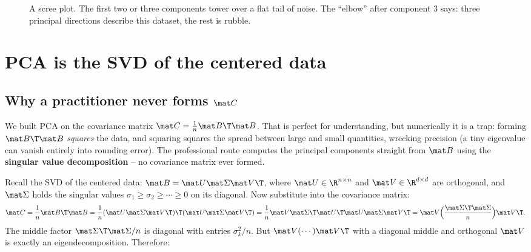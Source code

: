 \begin{figure}[H]
\centering
{}
\caption{A scree plot. The first two or three components tower over a flat tail of
noise. The ``elbow'' after component 3 says: three principal directions describe
this dataset, the rest is rubble.}
\label{ch30:scree}
\end{figure}

\section{PCA is the SVD of the centered data}

\subsection{Why a practitioner never forms $\mat C$}

We built PCA on the covariance matrix $\mat C=\tfrac1n\mat B\T\mat B$. That is
perfect for understanding, but numerically it is a trap: forming $\mat B\T\mat B$
\emph{squares} the data, and squaring squares the spread between large and small
quantities, wrecking precision (a tiny eigenvalue can vanish entirely into rounding
error). The professional route computes the principal components straight from
$\mat B$ using the \textbf{singular value decomposition} -- no covariance matrix
ever formed.

Recall the SVD of the centered data: $\mat B=\mat U\mat\Sigma\mat V\T$, where $\mat
U\in\R^{n\times n}$ and $\mat V\in\R^{d\times d}$ are orthogonal, and $\mat\Sigma$
holds the singular values $\sigma_1\ge\sigma_2\ge\cdots\ge0$ on its diagonal. Now
substitute into the covariance matrix:
\[
  \mat C=\frac1n\mat B\T\mat B
        =\frac1n(\mat U\mat\Sigma\mat V\T)\T(\mat U\mat\Sigma\mat V\T)
        =\frac1n\mat V\mat\Sigma\T\mat U\T\mat U\mat\Sigma\mat V\T
        =\mat V\Big(\frac{\mat\Sigma\T\mat\Sigma}{n}\Big)\mat V\T .
\]
The middle factor $\mat\Sigma\T\mat\Sigma/n$ is diagonal with entries
$\sigma_k^2/n$. But $\mat V(\cdots)\mat V\T$ with a diagonal middle and orthogonal
$\mat V$ is exactly an eigendecomposition. Therefore:

